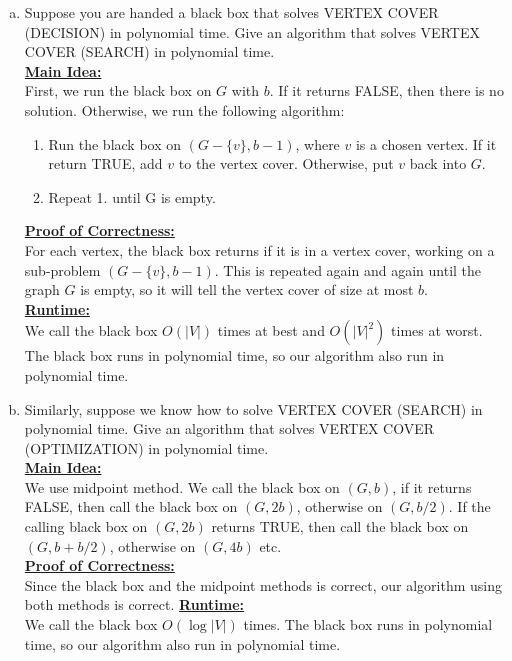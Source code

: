 \documentclass{article}\usepackage[utf8]{inputenc}\usepackage[margin=0.4cm,top=0.4cm,bottom=0.4cm]{geometry}\usepackage[usenames,dvipsnames,svgnames,table]{xcolor}
\begin{document}
\begin{enumerate}[(a)]
\item Suppose you are handed a black box that solves \textsc{VERTEX COVER (DECISION)} in polynomial time. Give an algorithm that solves \textsc{VERTEX COVER (SEARCH)} in polynomial time.
\BeginSolution %
\\
\underline{\textbf{Main Idea:}} \\
First, we run the black box on $G$ with $b$. If it returns FALSE, then there is no solution. Otherwise, we run the following algorithm:
%
\begin{enumerate}
	\item Run the black box on $(G-\{v\}, b-1)$, where $v$ is a chosen vertex. If it return TRUE, add $v$ to the vertex cover. Otherwise, put $v$ back into $G$.
	\item Repeat 1. until G is empty.
\end{enumerate}
%
\underline{\textbf{Proof of Correctness:}} \\
For each vertex, the black box returns if it is in a vertex cover, working on a sub-problem $(G-\{v\}, b-1)$. This is repeated again and again until the graph $G$ is empty, so it will tell the vertex cover of size at most $b$.\\
\underline{\textbf{Runtime:}} \\
We call the black box $O(|V|)$ times at best and $O(|V|^2)$ times at worst. The black box runs in polynomial time, so our algorithm also run in polynomial time.
\EndSolution
\item Similarly, suppose we know how to solve \textsc{VERTEX COVER (SEARCH)} in polynomial time. Give an algorithm that solves \textsc{VERTEX COVER (OPTIMIZATION)} in polynomial time.
\BeginSolution %
\\
\underline{\textbf{Main Idea:}} \\
We use midpoint method. We call the black box on $(G,b)$, if it returns FALSE, then call the black box on $(G,2b)$, otherwise on $(G,b/2)$. If the calling black box on $(G,2b)$ returns TRUE, then call the black box on $(G,b+b/2)$, otherwise on $(G,4b)$ etc.\\
\underline{\textbf{Proof of Correctness:}} \\
Since the black box and the midpoint methods is correct, our algorithm using both methods is correct.
\underline{\textbf{Runtime:}} \\
We call the black box $O(\log |V|)$ times. The black box runs in polynomial time, so our algorithm also run in polynomial time. 
\EndSolution
\end{enumerate}
\clearpage
\end{document}
